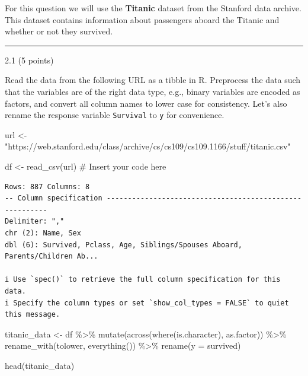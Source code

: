\documentclass[
  letterpaper,
  DIV=11,
  numbers=noendperiod]{scrartcl}
\newenvironment{Shaded}{\begin{snugshade}}{\end{snugshade}}
\newcommand{\AttributeTok}[1]{\textcolor[rgb]{0.40,0.45,0.13}{#1}}
\newcommand{\CommentTok}[1]{\textcolor[rgb]{0.37,0.37,0.37}{#1}}
\newcommand{\FunctionTok}[1]{\textcolor[rgb]{0.28,0.35,0.67}{#1}}
\newcommand{\NormalTok}[1]{\textcolor[rgb]{0.00,0.23,0.31}{#1}}
\newcommand{\OtherTok}[1]{\textcolor[rgb]{0.00,0.23,0.31}{#1}}
\newcommand{\SpecialCharTok}[1]{\textcolor[rgb]{0.37,0.37,0.37}{#1}}
\newcommand{\StringTok}[1]{\textcolor[rgb]{0.13,0.47,0.30}{#1}}
\begin{document}
For this question we will use the \textbf{Titanic} dataset from the
Stanford data archive. This dataset contains information about
passengers aboard the Titanic and whether or not they survived.

\begin{center}\rule{0.5\linewidth}{0.5pt}\end{center}

2.1 (5 points)

Read the data from the following URL as a tibble in R. Preprocess the
data such that the variables are of the right data type, e.g., binary
variables are encoded as factors, and convert all column names to lower
case for consistency. Let's also rename the response variable
\texttt{Survival} to \texttt{y} for convenience.

\begin{Shaded}
\begin{Highlighting}[]
\NormalTok{url }\OtherTok{\textless{}{-}} \StringTok{"https://web.stanford.edu/class/archive/cs/cs109/cs109.1166/stuff/titanic.csv"}

\NormalTok{df }\OtherTok{\textless{}{-}} \FunctionTok{read\_csv}\NormalTok{(url) }\CommentTok{\# Insert your code here}
\end{Highlighting}
\end{Shaded}

\begin{verbatim}
Rows: 887 Columns: 8
-- Column specification --------------------------------------------------------
Delimiter: ","
chr (2): Name, Sex
dbl (6): Survived, Pclass, Age, Siblings/Spouses Aboard, Parents/Children Ab...

i Use `spec()` to retrieve the full column specification for this data.
i Specify the column types or set `show_col_types = FALSE` to quiet this message.
\end{verbatim}

\begin{Shaded}
\begin{Highlighting}[]
\NormalTok{titanic\_data }\OtherTok{\textless{}{-}}\NormalTok{ df }\SpecialCharTok{\%\textgreater{}\%}
  \FunctionTok{mutate}\NormalTok{(}\FunctionTok{across}\NormalTok{(}\FunctionTok{where}\NormalTok{(is.character), as.factor)) }\SpecialCharTok{\%\textgreater{}\%} 
  \FunctionTok{rename\_with}\NormalTok{(tolower, }\FunctionTok{everything}\NormalTok{()) }\SpecialCharTok{\%\textgreater{}\%}
  \FunctionTok{rename}\NormalTok{(}\AttributeTok{y =}\NormalTok{ survived)}


\FunctionTok{head}\NormalTok{(titanic\_data)}
\end{Highlighting}
\end{Shaded}
\end{document}
